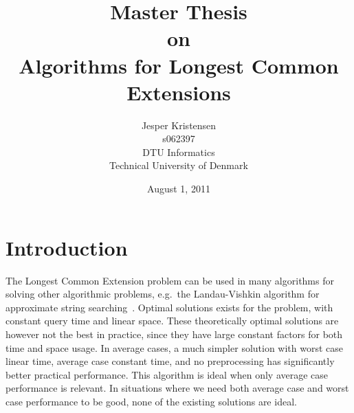 \documentclass[a4]{article}
\title{{\large Master Thesis}\\{\normalsize on}\\Algorithms for Longest Common Extensions}
\author{Jesper Kristensen\\s062397\\DTU Informatics\\Technical University of Denmark}
\date{August 1, 2011}
\begin{document}
\newif\ifarticle
\newif\ifreport

\reporttrue

\maketitle

\newcommand{\sortt}{\textit{sort}(n,\sigma)}
\newcommand{\LCE}{\textit{LCE}}
\newcommand{\NCA}{\textit{NCA}}
\newcommand{\RMQ}{\textit{RMQ}}
\newcommand{\SA}{\textit{SA}}
\newcommand{\SAinv}{\textit{SA}^{-1}} %
\newcommand{\SAi}{SA$^{-1}$} %
\newcommand{\LCP}{\textit{LCP}}
\newcommand{\LA}{\textit{LA}}
\newcommand{\suff}{\textit{suff}}
\newcommand{\logceil}{\lceil\log n\rceil}
\newcommand{\fprint}[1][k]{\ensuremath{\proc{Fingerprint}_{#1}}}
\newcommand{\fprintk}{\fprint[k]}
\newcommand{\RMQpq}[2]{RMQ\textless$#1$, $#2$\textgreater}
\newcommand{\RMQn}{\RMQpq{1}{n}}
\newcommand{\RMQq}{\RMQpq{n}{1}}
\newcommand{\RMQlog}{\RMQpq{n}{\log n}}


\tableofcontents

\vspace{1cm}

\newpage

\section{Introduction\label{sec:intro}}

The Longest Common Extension problem can be used in many algorithms for solving other algorithmic problems, e.g.\ the Landau-Vishkin algorithm for approximate string searching~\cite{approx-search}. Optimal solutions exists for the problem, with constant query time and linear space. These theoretically optimal solutions are however not the best in practice, since they have large constant factors for both time and space usage. In average cases, a much simpler solution with worst case linear time, average case constant time, and no preprocessing has significantly better practical performance. This algorithm is ideal when only average case performance is relevant. In situations where we need both average case and worst case performance to be good, none of the existing solutions are ideal.
\end{document}
